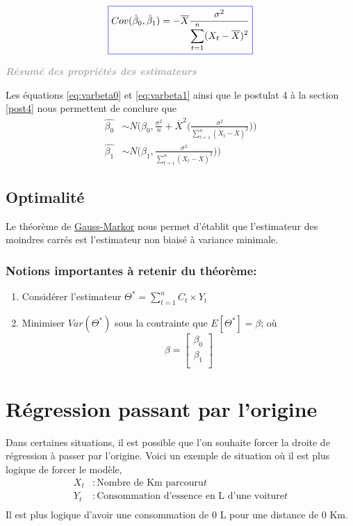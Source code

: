 \documentclass[11pt,french]{report}
\newenvironment{moreInfo}[1]
	{\begin{mdframed}
	\textcolor{darkgray}{\huge \raisebox{-3.5pt}{\faInfo} 
	\hspace{0.5cm} \large\bfseries #1}\\[5pt]
	\normalsize
	\makebox[0.1\textwidth][l]{}	
	\begin{minipage}{10cm}}
	{	\end{minipage}
	\end{mdframed}}
\begin{document}
\begin{equation}
\label{eq:covariance}
\color{blue}
\boxed{\color{black}
Cov(\hat{\beta}_0, \hat{\beta}_1) = - \overline{X} \frac{\sigma^2}{\displaystyle\sum_{t=1}^n (X_t - \overline{X})^2}}
\end{equation}

\bigskip
\begin{moreInfo}{\emph{Résumé des propriétés des estimateurs}}
\label{res:estima}
	Les équations \ref{eq:varbeta0} et \ref{eq:varbeta1}  ainsi que le postulat 4 à la section \ref{post4} nous permettent de conclure que 
	\begin{align*}
	     \hat{\beta_0} &\sim N\Bigg(\beta_0, \frac{\sigma^2}{n}  + \overline{X}^2 \bigg(\frac{\sigma^2}{\displaystyle\sum_{t=1}^n (X_t - \overline{X})^2}\bigg)\Bigg) \\
	     \hat{\beta_1} &\sim N\Bigg(\beta_1, \frac{\sigma^2}{\displaystyle\sum_{t=1}^n(X_t - \overline{X})^2})\Bigg)
	\end{align*}

\end{moreInfo}
\bigskip

\subsection{Optimalité}
Le théorème de \href{https://fr.wikipedia.org/wiki/Théorème_de_Gauss-Markov}{Gauss-Markor} nous permet d'établit que l'estimateur des moindres carrés est l'estimateur non biaisé à variance minimale. 

\subsubsection*{Notions importantes à retenir du théorème:}
\begin{enumerate}
\item Considérer l'estimateur $\Theta^* = \displaystyle\sum_{t=1}^n C_t \times Y_t$
\item Minimiser $Var(\Theta^*)$ sous la contrainte que $E[\Theta^*] = \beta$; où
$$ \beta =
\begin{bmatrix}
  \beta_0 \\
  \beta_1 \\ 
\end{bmatrix} $$
\end{enumerate}

\section{Régression passant par l'origine}
Dans certaines situations, il est possible que l'on souhaite forcer la droite de régression à passer par l'origine.
Voici un exemple de situation où il est plus logique de forcer le modèle,
\begin{align*}
X_t &: \text{Nombre de Km parcouru} t \\
Y_t &: \text{Consommation d'essence en L d'une voiture} t\\
\end{align*}
Il est plus logique d'avoir une consommation de 0 L pour une distance de 0 Km.
\end{document}
